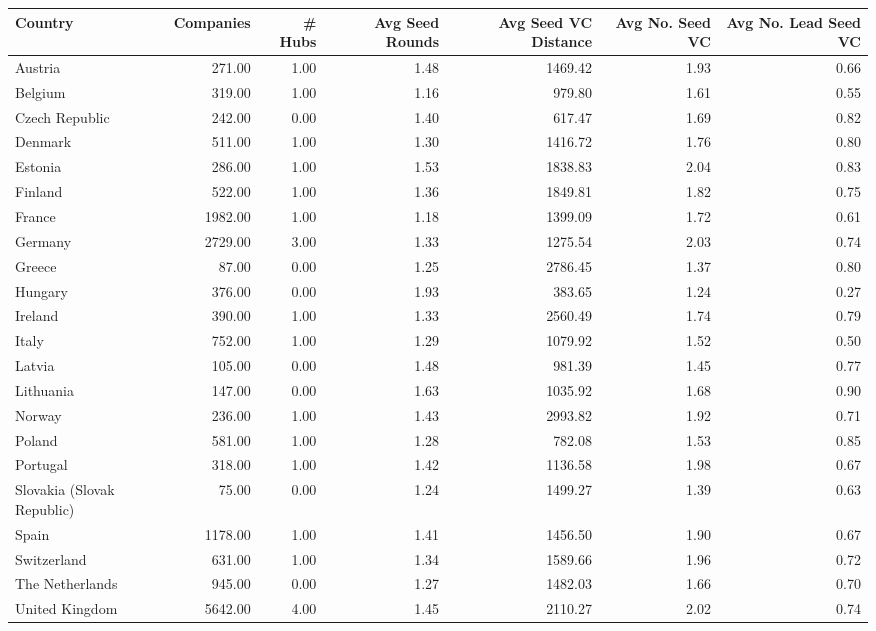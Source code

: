 \begin{tabular}{lrrrrrr}
  \toprule
Country & Companies & # Hubs & Avg Seed Rounds & Avg Seed VC Distance & Avg No. Seed VC & Avg No. Lead Seed VC \\ 
  \midrule
Austria & 271.00 & 1.00 & 1.48 & 1469.42 & 1.93 & 0.66 \\ 
  Belgium & 319.00 & 1.00 & 1.16 & 979.80 & 1.61 & 0.55 \\ 
  Czech Republic & 242.00 & 0.00 & 1.40 & 617.47 & 1.69 & 0.82 \\ 
  Denmark & 511.00 & 1.00 & 1.30 & 1416.72 & 1.76 & 0.80 \\ 
  Estonia & 286.00 & 1.00 & 1.53 & 1838.83 & 2.04 & 0.83 \\ 
  Finland & 522.00 & 1.00 & 1.36 & 1849.81 & 1.82 & 0.75 \\ 
  France & 1982.00 & 1.00 & 1.18 & 1399.09 & 1.72 & 0.61 \\ 
  Germany & 2729.00 & 3.00 & 1.33 & 1275.54 & 2.03 & 0.74 \\ 
  Greece & 87.00 & 0.00 & 1.25 & 2786.45 & 1.37 & 0.80 \\ 
  Hungary & 376.00 & 0.00 & 1.93 & 383.65 & 1.24 & 0.27 \\ 
  Ireland & 390.00 & 1.00 & 1.33 & 2560.49 & 1.74 & 0.79 \\ 
  Italy & 752.00 & 1.00 & 1.29 & 1079.92 & 1.52 & 0.50 \\ 
  Latvia & 105.00 & 0.00 & 1.48 & 981.39 & 1.45 & 0.77 \\ 
  Lithuania & 147.00 & 0.00 & 1.63 & 1035.92 & 1.68 & 0.90 \\ 
  Norway & 236.00 & 1.00 & 1.43 & 2993.82 & 1.92 & 0.71 \\ 
  Poland & 581.00 & 1.00 & 1.28 & 782.08 & 1.53 & 0.85 \\ 
  Portugal & 318.00 & 1.00 & 1.42 & 1136.58 & 1.98 & 0.67 \\ 
  Slovakia (Slovak Republic) & 75.00 & 0.00 & 1.24 & 1499.27 & 1.39 & 0.63 \\ 
  Spain & 1178.00 & 1.00 & 1.41 & 1456.50 & 1.90 & 0.67 \\ 
  Switzerland & 631.00 & 1.00 & 1.34 & 1589.66 & 1.96 & 0.72 \\ 
  The Netherlands & 945.00 & 0.00 & 1.27 & 1482.03 & 1.66 & 0.70 \\ 
  United Kingdom & 5642.00 & 4.00 & 1.45 & 2110.27 & 2.02 & 0.74 \\ 
   \bottomrule
\end{tabular}
